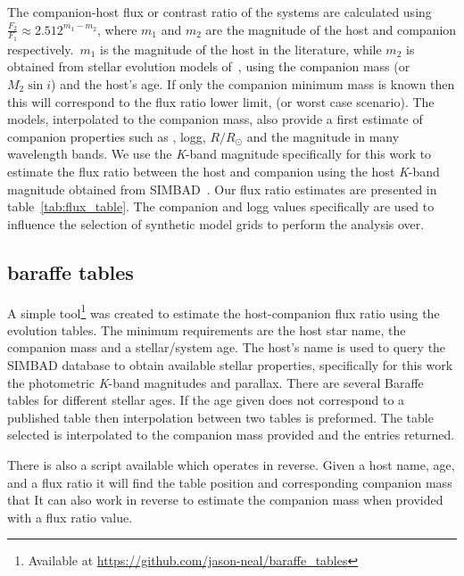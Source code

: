\label{compaion flux ration}
The companion-host flux or contrast ratio of the systems are calculated using \(\frac{F_{2}}{F_{1}} \approx 2.512^{m_{1}-m_{2}}\), where \(m_{1}\) and \(m_{2}\) are the magnitude of the host and companion respectively.\ \(m_{1}\) is the magnitude of the host in the literature, while \(m_{2}\) is obtained from stellar evolution models of~\citet{baraffe_evolutionary_2003, baraffe_new_2015}, using the companion mass (or \(M_{2}\sin{i}\)) and the host's age. If only the companion minimum mass is known then this will correspond to the flux ratio lower limit, (or worst case scenario). The models, interpolated to the companion mass, also provide a first estimate of companion properties such as \teff{}, logg, \(R/R_{\odot}\) and the magnitude in many wavelength bands.
We use the \emph{K}-band magnitude specifically for this work to estimate the flux ratio between the host and companion using the host \emph{K}-band magnitude obtained from {SIMBAD}~\citep{wenger_simbad_2000}. Our flux ratio estimates are presented in table~\ref{tab:flux_table}.
The companion \teff{} and logg values specifically are used to influence the selection of synthetic model grids to perform the \textchisquared{} analysis over.

\subsection{baraffe tables}
A simple tool\footnote{Available at \url{https://github.com/jason-neal/baraffe_tables}} was created to estimate the host-companion flux ratio using the~\citep{baraffe_evolutionary_2003,baraffe_new_2015} evolution tables. The minimum requirements are the host star name, the companion mass and a stellar/system age. The host's name is used to query the {SIMBAD} database to obtain available stellar properties, specifically for this work the photometric \textit{K}-band magnitudes and parallax. There are several Baraffe tables for different stellar ages. If the age given does not correspond to a published table then interpolation between two tables is preformed. The table selected is interpolated to the companion mass provided and the entries returned.

There is also a script available which operates in reverse. Given a host name, age, and a flux ratio it will find the table position and corresponding companion mass that It can also work in reverse to estimate the companion mass when provided with a flux ratio value.




